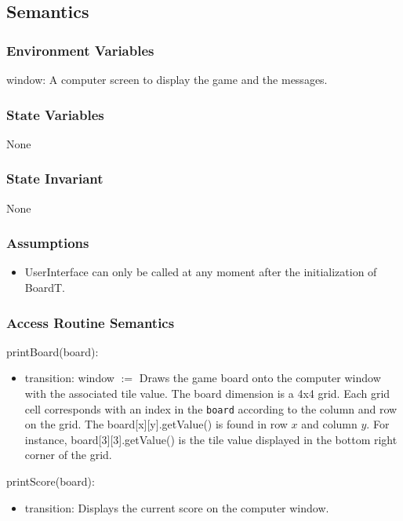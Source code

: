 \documentclass[12pt]{article}
\begin{document}
\subsection* {Semantics}

\subsubsection* {Environment Variables}
window: A computer screen to display the game and the messages.

\subsubsection* {State Variables}

None

\subsubsection* {State Invariant}

None

\subsubsection* {Assumptions}

\begin{itemize}
  \item UserInterface can only be called at any moment after the initialization of BoardT.
\end{itemize}

\subsubsection* {Access Routine Semantics}

\noindent printBoard(board):
\begin{itemize}
\item transition: window $:=$ Draws the game board onto the computer window with the associated tile value. The board dimension is a 4x4 grid. Each grid cell corresponds with an index in the \verb|board| according to the column and row on the grid. The board[x][y].getValue() is found in row $x$ and column $y$. For instance, board[3][3].getValue() is the tile value displayed in the bottom right corner of the grid.
\end{itemize}

\noindent printScore(board):
\begin{itemize}
\item transition: Displays the current score on the computer window.
\end{itemize}
\end{document}
